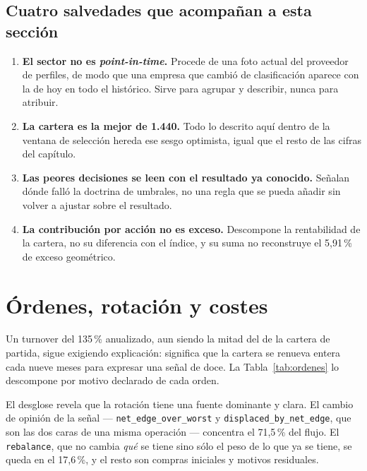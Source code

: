 \subsection*{Cuatro salvedades que acompañan a esta sección}

\begin{enumerate}[leftmargin=*,itemsep=0.35em]
  \item \textbf{El sector no es \textit{point-in-time}.} Procede de una foto actual del proveedor de
  perfiles, de modo que una empresa que cambió de clasificación aparece con la de hoy en todo el
  histórico. Sirve para agrupar y describir, nunca para atribuir.
  \item \textbf{La cartera es la mejor de 1.440.} Todo lo descrito aquí dentro de la ventana de
  selección hereda ese sesgo optimista, igual que el resto de las cifras del capítulo.
  \item \textbf{Las peores decisiones se leen con el resultado ya conocido.} Señalan dónde falló la
  doctrina de umbrales, no una regla que se pueda añadir sin volver a ajustar sobre el resultado.
  \item \textbf{La contribución por acción no es exceso.} Descompone la rentabilidad de la cartera,
  no su diferencia con el índice, y su suma no reconstruye el 5,91\,\% de exceso geométrico.
\end{enumerate}

\section{Órdenes, rotación y costes}
\label{sec:rotacion}

Un turnover del 135\,\% anualizado, aun siendo la mitad del de la cartera de partida, sigue
exigiendo explicación: significa que la cartera se renueva entera cada nueve meses para expresar una
señal de doce. La Tabla~\ref{tab:ordenes} lo descompone por motivo declarado de cada orden.

\begin{table}[H]
  \centering
  \small
  \caption{Descomposición del flujo de cartera por motivo de orden.}
  \label{tab:ordenes}
  
  \caption*{Cubre la serie completa: 143 órdenes de la ventana de selección y 10 de la era
  reservada. El flujo es la suma de $|\Delta w|$ de cada orden y el coste agrega comisión y
  \textit{slippage} efectivamente cargados.}
\end{table}


El desglose revela que la rotación tiene una fuente dominante y clara. El cambio de opinión de la
señal --- \texttt{net\_edge\_over\_worst} y \texttt{displaced\_by\_net\_edge}, que son las dos caras
de una misma operación --- concentra el 71,5\,\% del flujo. El \texttt{rebalance}, que no cambia
\emph{qué} se tiene sino sólo el peso de lo que ya se tiene, se queda en el 17,6\,\%, y el resto son
compras iniciales y motivos residuales.

